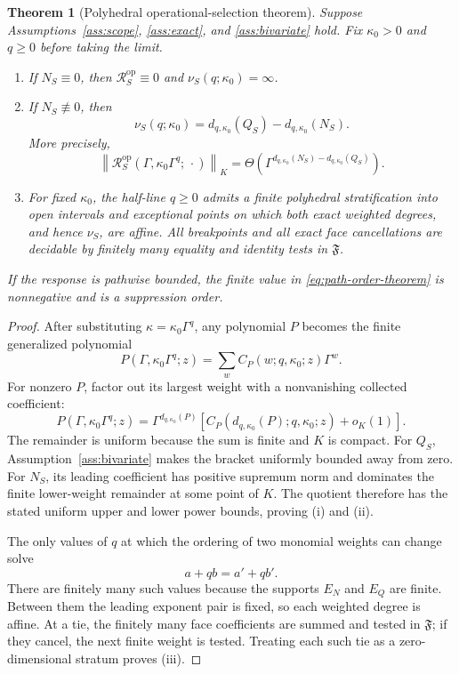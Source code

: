 \documentclass[11pt]{article}
\newtheorem{theorem}{Theorem}[section]
\theoremstyle{definition}
\theoremstyle{remark}
\theoremstyle{plain}
\newcommand{\R}{\mathcal R}
\newcommand{\normK}[1]{\left\lVert #1\right\rVert_{K}}
\newcommand{\op}{\mathrm{op}}
\begin{document}
\begin{theorem}[Polyhedral operational-selection theorem]
\label{thm:polyhedral-selection}
Suppose Assumptions~\ref{ass:scope}, \ref{ass:exact}, and
\ref{ass:bivariate} hold.  Fix $\kappa_0>0$ and $q\ge0$ before taking the
limit.
\begin{enumerate}[label=(\roman*)]
 \item If $N_S\equiv0$, then
 $\R_S^{\op}\equiv0$ and $\nu_S(q;\kappa_0)=\infty$.
 \item If $N_S\not\equiv0$, then
 \begin{equation}\label{eq:path-order-theorem}
  \boxed{\;
  \nu_S(q;\kappa_0)
  =d_{q,\kappa_0}(Q_S)-d_{q,\kappa_0}(N_S).\;}
 \end{equation}
 More precisely,
 \[
  \normK{\R_S^{\op}
   (\Gamma,\kappa_0\Gamma^q;\,\cdot)}
  =\Theta\!\left(
  \Gamma^{d_{q,\kappa_0}(N_S)-d_{q,\kappa_0}(Q_S)}
  \right).
 \]
 \item For fixed $\kappa_0$, the half-line $q\ge0$ admits a finite
 polyhedral stratification into open intervals and exceptional points on
 which both exact weighted degrees, and hence $\nu_S$, are affine.  All
 breakpoints and all exact face cancellations are decidable by finitely many
 equality and identity tests in $\mathfrak F$.
\end{enumerate}
If the response is pathwise bounded, the finite value in
\eqref{eq:path-order-theorem} is nonnegative and is a suppression order.
\end{theorem}

\begin{proof}
After substituting $\kappa=\kappa_0\Gamma^q$, any polynomial $P$ becomes the
finite generalized polynomial
\[
 P(\Gamma,\kappa_0\Gamma^q;z)
 =\sum_w C_P(w;q,\kappa_0;z)\Gamma^w.
\]
For nonzero $P$, factor out its largest weight with a nonvanishing collected
coefficient:
\[
 P(\Gamma,\kappa_0\Gamma^q;z)
 =\Gamma^{d_{q,\kappa_0}(P)}
 \left[C_P(d_{q,\kappa_0}(P);q,\kappa_0;z)+o_K(1)\right].
\]
The remainder is uniform because the sum is finite and $K$ is compact.
For $Q_S$, Assumption~\ref{ass:bivariate} makes the bracket uniformly
bounded away from zero.  For $N_S$, its leading coefficient has positive
supremum norm and dominates the finite lower-weight remainder at some point
of $K$.  The quotient therefore has the stated uniform upper and lower power
bounds, proving (i) and (ii).

The only values of $q$ at which the ordering of two monomial weights can
change solve
\[
 a+qb=a'+qb'.
\]
There are finitely many such values because the supports $E_N$ and $E_Q$ are
finite.  Between them the leading exponent pair is fixed, so each weighted
degree is affine.  At a tie, the finitely many face coefficients are summed
and tested in $\mathfrak F$; if they cancel, the next finite weight is tested.
Treating each such tie as a zero-dimensional stratum proves (iii).
\end{proof}
\end{document}
